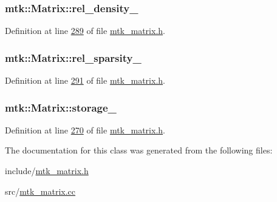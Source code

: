 \hypertarget{classmtk_1_1Matrix_adae5d1f3016d891e67a10d6db658d5a7}{
\subsubsection[{rel\-\_\-density\-\_\-}]{ mtk\-::\-Matrix\-::rel\-\_\-density\-\_\-\hspace{0.3cm}{\ttfamily [private]}}}\label{classmtk_1_1Matrix_adae5d1f3016d891e67a10d6db658d5a7}


Definition at line \hyperlink{mtk__matrix_8h_source_l00289}{289} of file \hyperlink{mtk__matrix_8h_source}{mtk\-\_\-matrix.\-h}.

\hypertarget{classmtk_1_1Matrix_aab48952c7df158b6ee06d8c2c901aa7e}{
\subsubsection[{rel\-\_\-sparsity\-\_\-}]{ mtk\-::\-Matrix\-::rel\-\_\-sparsity\-\_\-\hspace{0.3cm}{\ttfamily [private]}}}\label{classmtk_1_1Matrix_aab48952c7df158b6ee06d8c2c901aa7e}


Definition at line \hyperlink{mtk__matrix_8h_source_l00291}{291} of file \hyperlink{mtk__matrix_8h_source}{mtk\-\_\-matrix.\-h}.

\hypertarget{classmtk_1_1Matrix_ae343697531e0849f20bed4a9760b9a54}{
\subsubsection[{storage\-\_\-}]{ mtk\-::\-Matrix\-::storage\-\_\-\hspace{0.3cm}{\ttfamily [private]}}}\label{classmtk_1_1Matrix_ae343697531e0849f20bed4a9760b9a54}


Definition at line \hyperlink{mtk__matrix_8h_source_l00270}{270} of file \hyperlink{mtk__matrix_8h_source}{mtk\-\_\-matrix.\-h}.



The documentation for this class was generated from the following files\-:\begin{DoxyCompactItemize}
\item 
include/\hyperlink{mtk__matrix_8h}{mtk\-\_\-matrix.\-h}\item 
src/\hyperlink{mtk__matrix_8cc}{mtk\-\_\-matrix.\-cc}\end{DoxyCompactItemize}

